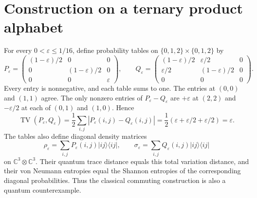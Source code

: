 \documentclass[11pt,a4paper]{article}
\newcommand{\eps}{\varepsilon}
\newcommand{\TV}{\operatorname{TV}}
\begin{document}
\section{Construction on a ternary product alphabet}
For every $0<\eps\le1/16$, define probability tables on $\{0,1,2\}\times\{0,1,2\}$ by
\begin{equation}
P_\eps=\begin{pmatrix}
(1-\eps)/2&0&0\\
0&(1-\eps)/2&0\\
0&0&\eps
\end{pmatrix},\qquad
Q_\eps=\begin{pmatrix}
(1-\eps)/2&\eps/2&0\\
\eps/2&(1-\eps)/2&0\\
0&0&0
\end{pmatrix}.
\end{equation}
Every entry is nonnegative, and each table sums to one. The entries at $(0,0)$ and $(1,1)$ agree. The only nonzero entries of $P_\eps-Q_\eps$ are $+\eps$ at $(2,2)$ and $-\eps/2$ at each of $(0,1)$ and $(1,0)$. Hence
\begin{equation}
\TV(P_\eps,Q_\eps)=\frac12\sum_{i,j}|P_\eps(i,j)-Q_\eps(i,j)|
=\frac12(\eps+\eps/2+\eps/2)=\eps.
\end{equation}
The tables also define diagonal density matrices
\begin{equation}
\rho_\eps=\sum_{i,j}P_\eps(i,j)|ij\rangle\langle ij|,\qquad
\sigma_\eps=\sum_{i,j}Q_\eps(i,j)|ij\rangle\langle ij|
\end{equation}
on $\mathbb C^3\otimes\mathbb C^3$. Their quantum trace distance equals this total variation distance, and their von Neumann entropies equal the Shannon entropies of the corresponding diagonal probabilities. Thus the classical commuting construction is also a quantum counterexample.
\end{document}
